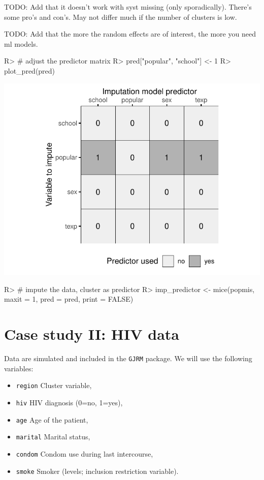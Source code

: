 \documentclass[
]{jss}
\providecommand{\tightlist}{%
  \setlength{\itemsep}{0pt}\setlength{\parskip}{0pt}}
\begin{document}
TODO: Add that it doesn't work with syst missing (only sporadically).
There's some pro's and con's. May not differ much if the number of
clusters is low.

TODO: Add that the more the random effects are of interest, the more you
need ml models.

\begin{CodeChunk}
\begin{CodeInput}
R> # adjust the predictor matrix
R> pred["popular", "school"] <- 1 
R> plot_pred(pred)
\end{CodeInput}


\begin{center}\includegraphics{Imputation_of_Incomplete_Multilevel_Data_files/figure-latex/pop_predictor-1} \end{center}

\begin{CodeInput}
R> # impute the data, cluster as predictor
R> imp_predictor <- mice(popmis, maxit = 1, pred = pred, print = FALSE)
\end{CodeInput}
\end{CodeChunk}

\hypertarget{case-study-ii-hiv-data}{%
\section{Case study II: HIV data}\label{case-study-ii-hiv-data}}

Data are simulated and included in the \texttt{GJRM} package. We will
use the following variables:

\begin{itemize}
\tightlist
\item
  \texttt{region} Cluster variable,
\item
  \texttt{hiv} HIV diagnosis (0=no, 1=yes),
\item
  \texttt{age} Age of the patient,
\item
  \texttt{marital} Marital status,
\item
  \texttt{condom} Condom use during last intercourse,
\item
  \texttt{smoke} Smoker (levels; inclusion restriction variable).
\end{itemize}
\end{document}
